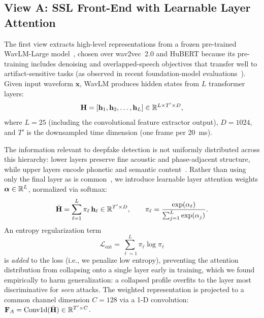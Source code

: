 \subsection{View A: SSL Front-End with Learnable Layer Attention}
\label{ssec:viewa}

The first view extracts high-level representations from a frozen pre-trained
WavLM-Large model~\cite{chen2022wavlm}, chosen over wav2vec~2.0 and HuBERT because its
pre-training includes denoising and overlapped-speech objectives that transfer well to
artifact-sensitive tasks (as observed in recent foundation-model evaluations~\cite{pascu2024calibrated,combei2024wavlm}). Given
input waveform $\mathbf{x}$, WavLM produces hidden states from $L$ transformer layers:
\begin{equation}
\mathbf{H} = [\mathbf{h}_1, \mathbf{h}_2, \ldots, \mathbf{h}_L] \in \mathbb{R}^{L \times T' \times D},
\end{equation}
where $L = 25$ (including the convolutional feature extractor output), $D = 1024$, and
$T'$ is the downsampled time dimension (one frame per 20~ms).

The information relevant to deepfake detection is not uniformly distributed across this
hierarchy: lower layers preserve fine acoustic and phase-adjacent structure, while upper
layers encode phonetic and semantic content~\cite{pan2024attentive}. Rather than using
only the final layer as is common~\cite{tak2022automatic}, we introduce learnable layer
attention weights $\boldsymbol{\alpha} \in \mathbb{R}^L$, normalized via softmax:
\begin{equation}
\bar{\mathbf{H}} = \sum_{\ell=1}^L \pi_\ell \, \mathbf{h}_\ell \in \mathbb{R}^{T' \times D},
\qquad
\pi_\ell = \frac{\exp(\alpha_\ell)}{\sum_{j=1}^L \exp(\alpha_j)}.
\label{eq:layerattn}
\end{equation}
An entropy regularization term
\begin{equation}
\mathcal{L}_{\text{ent}} = \sum_{\ell=1}^{L} \pi_\ell \log \pi_\ell
\label{eq:entreg}
\end{equation}
is \emph{added} to the loss (i.e., we penalize low entropy), preventing the attention
distribution from collapsing onto a single layer early in training, which we found
empirically to harm generalization: a collapsed profile overfits to the layer most
discriminative for \emph{seen} attacks. The weighted representation is projected to a
common channel dimension $C = 128$ via a 1-D convolution:
$\mathbf{F}_A = \operatorname{Conv1d}(\bar{\mathbf{H}}) \in \mathbb{R}^{T' \times C}$.

